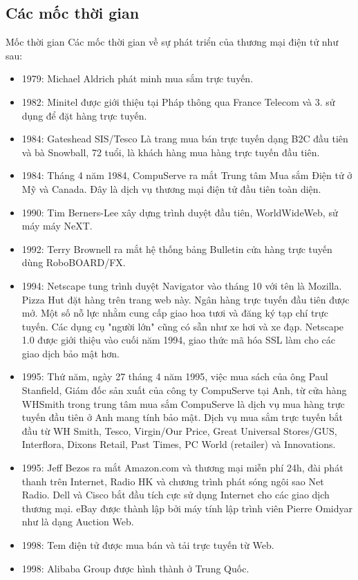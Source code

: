 \documentclass[12pt]{article}
\begin{document}
\subsection{Các mốc thời gian}
Mốc thời gian
Các mốc thời gian về sự phát triển của thương mại điện tử như sau:
\begin{itemize}
\item 1979: Michael Aldrich phát minh mua sắm trực tuyến.
\item 1982: Minitel được giới thiệu tại Pháp thông qua France Telecom và 3. sử dụng để đặt hàng trực tuyến.
\item 1984: Gateshead SIS/Tesco Là trang mua bán trực tuyến dạng B2C đầu tiên và bà Snowball, 72 tuổi, là khách hàng mua hàng trực tuyến đầu tiên.
\item 1984: Tháng 4 năm 1984, CompuServe ra mắt Trung tâm Mua sắm Điện tử ở Mỹ và Canada. Đây là dịch vụ thương mại điện tử đầu tiên toàn diện.
\item 1990: Tim Berners-Lee xây dựng trình duyệt đầu tiên, WorldWideWeb, sử máy máy NeXT.
\item 1992: Terry Brownell ra mắt hệ thống bảng Bulletin cửa hàng trực tuyến dùng RoboBOARD/FX.
\item 1994: Netscape tung trình duyệt Navigator vào tháng 10 với tên là Mozilla. Pizza Hut đặt hàng trên trang web này. Ngân hàng trực tuyến đầu tiên được mở. Một số nỗ lực nhằm cung cấp giao hoa tươi và đăng ký tạp chí trực tuyến. Các dụng cụ "người lớn" cũng có sẵn như xe hơi và xe đạp. Netscape 1.0 được giới thiệu vào cuối năm 1994, giao thức mã hóa SSL làm cho các giao dịch bảo mật hơn.
\item 1995: Thứ năm, ngày 27 tháng 4 năm 1995, việc mua sách của ông Paul Stanfield, Giám đốc sản xuất của công ty CompuServe tại Anh, từ cửa hàng WHSmith trong trung tâm mua sắm CompuServe là dịch vụ mua hàng trực tuyến đầu tiên ở Anh mang tính bảo mật. Dịch vụ mua sắm trực tuyến bắt đầu từ WH Smith, Tesco, Virgin/Our Price, Great Universal Stores/GUS, Interflora, Dixons Retail, Past Times, PC World (retailer) và Innovations.
\item 1995: Jeff Bezos ra mắt Amazon.com và thương mại miễn phí 24h, đài phát thanh trên Internet, Radio HK và chương trình phát sóng ngôi sao Net Radio. Dell và Cisco bắt đầu tích cực sử dụng Internet cho các giao dịch thương mại. eBay được thành lập bởi máy tính lập trình viên Pierre Omidyar như là dạng Auction Web.
\item 1998: Tem điện tử được mua bán và tải trực tuyến từ Web.
\item 1998: Alibaba Group được hình thành ở Trung Quốc.

\end{itemize}
\end{document}
